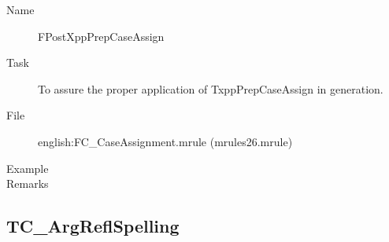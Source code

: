 \begin{description}
\vspace{1 cm}
\begin{description}
\item[Name] FPostXppPrepCaseAssign
\item[Task] To assure the proper application of TxppPrepCaseAssign in 
generation.
\item[File] english:FC\_CaseAssignment.mrule (mrules26.mrule)
\item[Example] 
\item[Remarks]
\end{description}

\end{description}

\newpage
\subsection{TC\_ArgReflSpelling}

